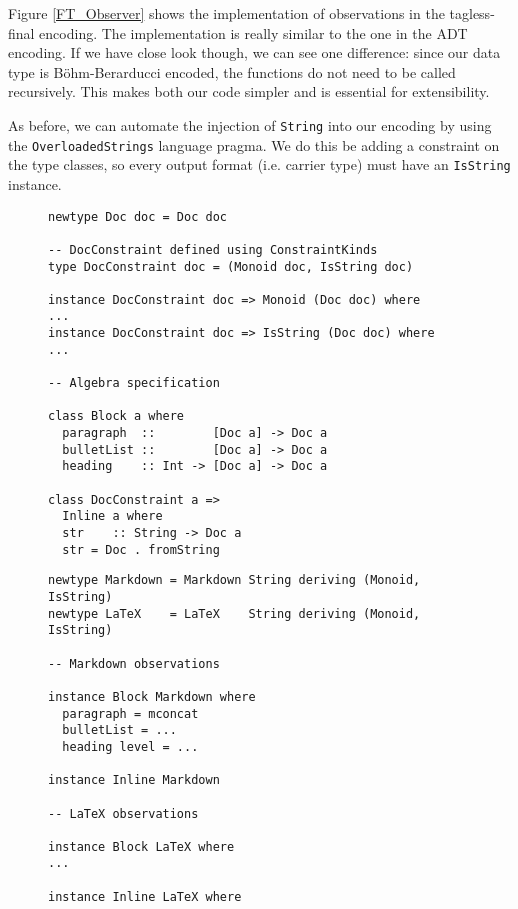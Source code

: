 Figure \ref{FT_Observer} shows the implementation of observations in the
tagless-final encoding. The implementation is really similar to the one in the
ADT encoding. If we have close look though, we can see one difference: since our
data type is Böhm-Berarducci encoded, the functions do not need to be called
recursively. This makes both our code simpler and is essential for
extensibility.

As before, we can automate the injection of \texttt{String} into our encoding by
using the \texttt{OverloadedStrings} language pragma. We do this be adding a
constraint on the type classes, so every output format (i.e. carrier type) must
have an \texttt{IsString} instance.

\begin{figure}
\begin{lstlisting}
newtype Doc doc = Doc doc

-- DocConstraint defined using ConstraintKinds
type DocConstraint doc = (Monoid doc, IsString doc)

instance DocConstraint doc => Monoid (Doc doc) where
...
instance DocConstraint doc => IsString (Doc doc) where
...

-- Algebra specification

class Block a where
  paragraph  ::        [Doc a] -> Doc a
  bulletList ::        [Doc a] -> Doc a
  heading    :: Int -> [Doc a] -> Doc a

class DocConstraint a =>
  Inline a where
  str    :: String -> Doc a
  str = Doc . fromString
\end{lstlisting}
\end{figure}

\begin{figure}
\begin{lstlisting}
newtype Markdown = Markdown String deriving (Monoid, IsString)
newtype LaTeX    = LaTeX    String deriving (Monoid, IsString)

-- Markdown observations

instance Block Markdown where
  paragraph = mconcat
  bulletList = ...
  heading level = ...

instance Inline Markdown

-- LaTeX observations

instance Block LaTeX where
...

instance Inline LaTeX where
\end{lstlisting}
\end{figure}

